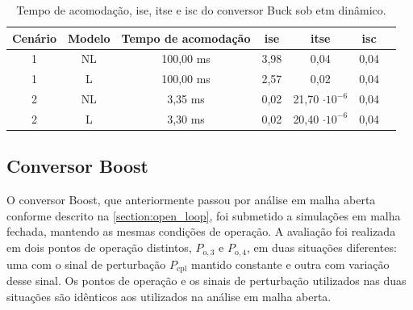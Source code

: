 \vspace{8pt}
\begin{table}[H]
  \centering
  \captionsetup{justification=centering}
  \setlength{\tabcolsep}{10pt}
  \begin{tabular}{ccccccc}
    \toprule
    Cenário & Modelo      & Tempo de acomodação & \acrshort{ise} & \acrshort{itse}       & \acrshort{isc} \\
    \midrule
    1       & NL  & 100,00 ms           & 3,98           & 0,04                  & 0,04           \\
    1       & L & 100,00 ms           & 2,57           & 0,02                  & 0,04           \\
    2       & NL  & 3,35 ms             & 0,02           & 21,70 $\cdot 10^{-6}$ & 0,04           \\
    2       & L & 3,30 ms             & 0,02           & 20,40 $\cdot 10^{-6}$ & 0,04           \\
    \bottomrule
  \end{tabular}
  \caption{Tempo de acomodação, \acrshort{ise}, \acrshort{itse} e \acrshort{isc} do conversor Buck sob \acrshort{etm} dinâmico.}
  \label{table:indices_desempenho_etm_dinamico}
\end{table}

\subsection{Conversor Boost}

O conversor Boost, que anteriormente passou por análise em malha aberta conforme descrito na \autoref{section:open_loop}, foi submetido a simulações em malha fechada, mantendo as mesmas condições de operação. A avaliação foi realizada em dois pontos de operação distintos, $P_{\mathrm{o}, 3}$ e $P_{\mathrm{o}, 4}$, em duas situações diferentes: uma com o sinal de perturbação $P_{\mathrm{cpl}}$ mantido constante e outra com variação desse sinal. Os pontos de operação e os sinais de perturbação utilizados nas duas situações são idênticos aos utilizados na análise em malha aberta.

